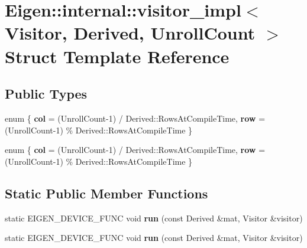 \hypertarget{struct_eigen_1_1internal_1_1visitor__impl}{}\section{Eigen\+:\+:internal\+:\+:visitor\+\_\+impl$<$ Visitor, Derived, Unroll\+Count $>$ Struct Template Reference}
\label{struct_eigen_1_1internal_1_1visitor__impl}
\subsection*{Public Types}
\begin{DoxyCompactItemize}
\item 
\mbox{\label{struct_eigen_1_1internal_1_1visitor__impl_a4b39f714c823cda14c72938cb9ad7ac4}} 
enum \{ {\bfseries col} = (Unroll\+Count-\/1) / Derived\+:\+:Rows\+At\+Compile\+Time, 
{\bfseries row} = (Unroll\+Count-\/1) \% Derived\+:\+:Rows\+At\+Compile\+Time
 \}
\item 
\mbox{\label{struct_eigen_1_1internal_1_1visitor__impl_a4a7c08d42b7c783cb392c41b218aa5a3}} 
enum \{ {\bfseries col} = (Unroll\+Count-\/1) / Derived\+:\+:Rows\+At\+Compile\+Time, 
{\bfseries row} = (Unroll\+Count-\/1) \% Derived\+:\+:Rows\+At\+Compile\+Time
 \}
\end{DoxyCompactItemize}
\subsection*{Static Public Member Functions}
\begin{DoxyCompactItemize}
\item 
\mbox{\label{struct_eigen_1_1internal_1_1visitor__impl_a9c4ba34851f1039623bbb8fef1db8513}} 
static E\+I\+G\+E\+N\+\_\+\+D\+E\+V\+I\+C\+E\+\_\+\+F\+U\+NC void {\bfseries run} (const Derived \&mat, Visitor \&visitor)
\item 
\mbox{\label{struct_eigen_1_1internal_1_1visitor__impl_a9c4ba34851f1039623bbb8fef1db8513}} 
static E\+I\+G\+E\+N\+\_\+\+D\+E\+V\+I\+C\+E\+\_\+\+F\+U\+NC void {\bfseries run} (const Derived \&mat, Visitor \&visitor)
\end{DoxyCompactItemize}



